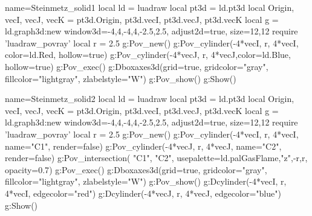 \documentclass[border=5pt,tikz]{standalone}%
\begin{document}
\begin{luadraw}{name=Steinmetz_solid1}
local ld = luadraw
local pt3d = ld.pt3d
local Origin, vecI, vecJ, vecK = pt3d.Origin, pt3d.vecI, pt3d.vecJ, pt3d.vecK
local g = ld.graph3d:new{ window3d={-4,4,-4,4,-2.5,2.5}, adjust2d=true, size={12,12}}
require 'luadraw_povray'
local r = 2.5
g:Pov_new()
g:Pov_cylinder(-4*vecI, r, 4*vecI, {color=ld.Red, hollow=true})
g:Pov_cylinder(-4*vecJ, r, 4*vecJ,{color=ld.Blue, hollow=true})
g:Pov_exec()
g:Dboxaxes3d({grid=true, gridcolor="gray", fillcolor="lightgray", zlabelstyle="W"})
g:Pov_show()
g:Show()
\end{luadraw}

\begin{luadraw}{name=Steinmetz_solid2}
local ld = luadraw
local pt3d = ld.pt3d
local Origin, vecI, vecJ, vecK = pt3d.Origin, pt3d.vecI, pt3d.vecJ, pt3d.vecK
local g = ld.graph3d:new{ window3d={-4,4,-4,4,-2.5,2.5}, adjust2d=true, size={12,12}}
require 'luadraw_povray'
local r = 2.5
g:Pov_new()
g:Pov_cylinder(-4*vecI, r, 4*vecI, {name="C1", render=false})
g:Pov_cylinder(-4*vecJ, r, 4*vecJ, {name="C2", render=false})
g:Pov_intersection( {"C1", "C2"}, {usepalette={ld.palGasFlame,"z",{-r,r}}, opacity=0.7})
g:Pov_exec()
g:Dboxaxes3d({grid=true, gridcolor="gray", fillcolor="lightgray", zlabelstyle="W"})
g:Pov_show()
g:Dcylinder(-4*vecI, r, 4*vecI, {edgecolor="red"})
g:Dcylinder(-4*vecJ, r, 4*vecJ, {edgecolor="blue"})
g:Show()
\end{luadraw}
\end{document}
